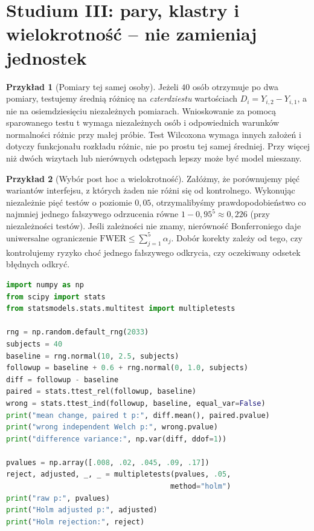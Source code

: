 \documentclass[11pt,a4paper,oneside]{report}
\numberwithin{equation}{chapter}
\theoremstyle{plain}
\theoremstyle{definition}
\newtheorem{przyklad}{Przykład}[chapter]
\theoremstyle{remark}
\begin{document}
\section{Studium III: pary, klastry i wielokrotność -- nie zamieniaj jednostek}
\begin{przyklad}[Pomiary tej samej osoby]
Jeżeli $40$ osób otrzymuje po dwa pomiary, testujemy średnią różnicę na \emph{czterdziestu} wartościach $D_i=Y_{i,2}-Y_{i,1}$, a nie na osiemdziesięciu niezależnych pomiarach. Wnioskowanie za pomocą sparowanego testu t wymaga niezależnych osób i odpowiednich warunków normalności różnic przy małej próbie. Test Wilcoxona wymaga innych założeń i dotyczy funkcjonału rozkładu różnic, nie po prostu tej samej średniej. Przy więcej niż dwóch wizytach lub nierównych odstępach lepszy może być model mieszany.
\end{przyklad}

\begin{przyklad}[Wybór post hoc a wielokrotność]
Załóżmy, że porównujemy pięć wariantów interfejsu, z których żaden nie różni się od kontrolnego. Wykonując niezależnie pięć testów o poziomie $0{,}05$, otrzymalibyśmy prawdopodobieństwo co najmniej jednego fałszywego odrzucenia równe $1-0{,}95^5\approx0{,}226$ (przy niezależności testów). Jeśli zależności nie znamy, nierówność Bonferroniego daje uniwersalne ograniczenie $\mathrm{FWER}\le\sum_{j=1}^5\alpha_j$. Dobór korekty zależy od tego, czy kontrolujemy ryzyko choć jednego fałszywego odkrycia, czy oczekiwany odsetek błędnych odkryć.
\end{przyklad}

\begin{lstlisting}[language=Python,caption={Kompletny program: dane sparowane, poprawny test różnic i ilustracja wielokrotności (Python, NumPy, SciPy, statsmodels).}]
import numpy as np
from scipy import stats
from statsmodels.stats.multitest import multipletests

rng = np.random.default_rng(2033)
subjects = 40
baseline = rng.normal(10, 2.5, subjects)
followup = baseline + 0.6 + rng.normal(0, 1.0, subjects)
diff = followup - baseline
paired = stats.ttest_rel(followup, baseline)
wrong = stats.ttest_ind(followup, baseline, equal_var=False)
print("mean change, paired t p:", diff.mean(), paired.pvalue)
print("wrong independent Welch p:", wrong.pvalue)
print("difference variance:", np.var(diff, ddof=1))

pvalues = np.array([.008, .02, .045, .09, .17])
reject, adjusted, _, _ = multipletests(pvalues, .05,
                                      method="holm")
print("raw p:", pvalues)
print("Holm adjusted p:", adjusted)
print("Holm rejection:", reject)
\end{lstlisting}
\end{document}
